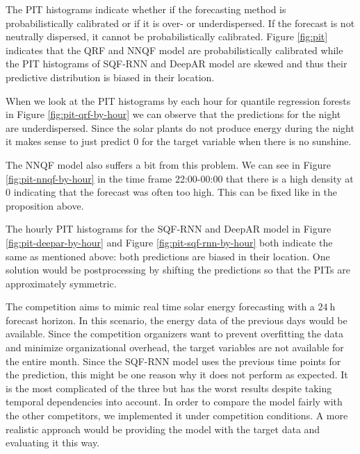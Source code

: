 The PIT histograms indicate whether if the forecasting method is probabilistically 
calibrated or if it is over- or underdispersed. If the forecast is not neutrally dispersed, 
it cannot be probabilistically calibrated.
Figure \ref{fig:pit} indicates that the QRF and NNQF model are 
probabilistically calibrated while the PIT histograms of SQF-RNN 
and DeepAR model are skewed and thus their predictive distribution is 
biased in their location.

When we look at the PIT histograms by each hour 
for quantile regression forests in Figure \ref{fig:pit-qrf-by-hour} 
we can observe that the predictions for the night are underdispersed. 
Since the solar plants do not produce energy during the night 
it makes sense to just predict \(0\) for the target variable when there is 
no sunshine.

The NNQF model also suffers a bit from this problem. We can see 
in Figure \ref{fig:pit-nnqf-by-hour} in the time frame 22:00-00:00 that 
there is a high density at \(0\) indicating that the forecast 
was often too high. This can be fixed like in the proposition above.

The hourly PIT histograms for the SQF-RNN and DeepAR model in 
Figure \ref{fig:pit-deepar-by-hour} and Figure \ref{fig:pit-sqf-rnn-by-hour} 
both indicate the same as mentioned above: both predictions are biased 
in their location. One solution would be postprocessing by shifting the 
predictions so that the PITs are approximately symmetric. 

The competition aims to mimic real time solar energy forecasting with 
a \(\SI{24}{\hour}\) forecast horizon. In this scenario, the energy data of 
the previous days would be available. Since the competition organizers want to 
prevent overfitting the data and minimize organizational overhead, 
the target variables are not available for 
the entire month. Since the SQF-RNN model uses the previous time points for the prediction, 
this might be one reason why it does not perform as expected. 
It is the most complicated of the three but has the worst results 
despite taking temporal dependencies into account. 
In order to compare the model fairly with the other competitors, 
we implemented it under competition conditions. A more realistic approach would be 
providing the model with the target data and evaluating it this way.